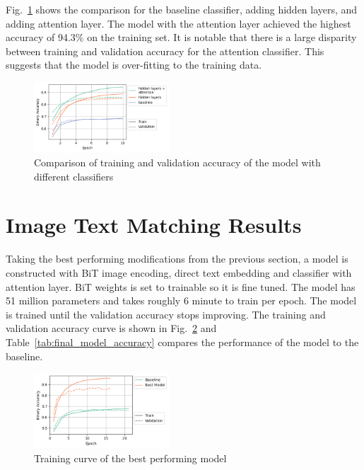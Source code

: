 \documentclass[conference]{IEEEtran}
\begin{document}
Fig.~\ref{fig:classifier_comparison} shows the comparison for the baseline classifier, adding hidden layers, and adding attention layer. The model with the attention layer achieved the highest accuracy of 94.3\% on the training set. It is notable that there is a large disparity between training and validation accuracy for the attention classifier. This suggests that the model is over-fitting to the training data.

\begin{figure}
    \centering
    \includegraphics[width=0.45\textwidth]{classifier_comparison.png}
    \caption{Comparison of training and validation accuracy of the model with different classifiers}
    \label{fig:classifier_comparison}
\end{figure}

\section{Image Text Matching Results}

Taking the best performing modifications from the previous section, a model is constructed with BiT image encoding, direct text embedding and classifier with attention layer. BiT weights is set to trainable so it is fine tuned. The model has 51 million parameters and takes roughly 6 minute to train per epoch. The model is trained until the validation accuracy stops improving. The training and validation accuracy curve is shown in Fig.~\ref{fig:final_model_accuracy} and Table~\ref{tab:final_model_accuracy} compares the performance of the model to the baseline.

\begin{figure}
    \centering
    \includegraphics[width=0.45\textwidth]{final_model_accuracy.png}
    \caption{Training curve of the best performing model}
    \label{fig:final_model_accuracy}
\end{figure}
\end{document}
